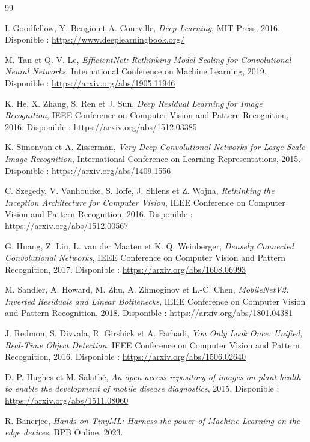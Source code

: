 ﻿\documentclass[11pt,a4paper,openany]{report}
\begin{document}
\begin{thebibliography}{99}

I. Goodfellow, Y. Bengio et A. Courville, \textit{Deep Learning}, MIT Press, 2016. Disponible : \url{https://www.deeplearningbook.org/}

M. Tan et Q. V. Le, \textit{EfficientNet: Rethinking Model Scaling for Convolutional Neural Networks}, International Conference on Machine Learning, 2019. Disponible : \url{https://arxiv.org/abs/1905.11946}

K. He, X. Zhang, S. Ren et J. Sun, \textit{Deep Residual Learning for Image Recognition}, IEEE Conference on Computer Vision and Pattern Recognition, 2016. Disponible : \url{https://arxiv.org/abs/1512.03385}

K. Simonyan et A. Zisserman, \textit{Very Deep Convolutional Networks for Large-Scale Image Recognition}, International Conference on Learning Representations, 2015. Disponible : \url{https://arxiv.org/abs/1409.1556}

C. Szegedy, V. Vanhoucke, S. Ioffe, J. Shlens et Z. Wojna, \textit{Rethinking the Inception Architecture for Computer Vision}, IEEE Conference on Computer Vision and Pattern Recognition, 2016. Disponible : \url{https://arxiv.org/abs/1512.00567}

G. Huang, Z. Liu, L. van der Maaten et K. Q. Weinberger, \textit{Densely Connected Convolutional Networks}, IEEE Conference on Computer Vision and Pattern Recognition, 2017. Disponible : \url{https://arxiv.org/abs/1608.06993}

M. Sandler, A. Howard, M. Zhu, A. Zhmoginov et L.-C. Chen, \textit{MobileNetV2: Inverted Residuals and Linear Bottlenecks}, IEEE Conference on Computer Vision and Pattern Recognition, 2018. Disponible : \url{https://arxiv.org/abs/1801.04381}

J. Redmon, S. Divvala, R. Girshick et A. Farhadi, \textit{You Only Look Once: Unified, Real-Time Object Detection}, IEEE Conference on Computer Vision and Pattern Recognition, 2016. Disponible : \url{https://arxiv.org/abs/1506.02640}

D. P. Hughes et M. Salathé, \textit{An open access repository of images on plant health to enable the development of mobile disease diagnostics}, 2015. Disponible : \url{https://arxiv.org/abs/1511.08060}

R. Banerjee, \textit{Hands-on TinyML: Harness the power of Machine Learning on the edge devices}, BPB Online, 2023.


\end{thebibliography}
\end{document}
